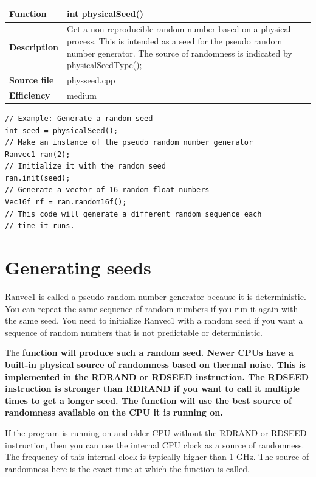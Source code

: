 \documentclass[11pt,a4paper,oneside,openright]{report}
\newcommand{\vspacesmall}{\vspace{3mm}}
\newcommand{\vspacebig}{\vspace{6mm}}
\newcommand{\codei}[1]{\bfseries \ttfamily{#1}\normalfont}
\begin{document}
\begin{tabular}{|p{30mm}|p{100mm}|}
\hline
\bfseries Function & int physicalSeed()  \\ \hline
\bfseries Description & Get a non-reproducible random number based on a physical process. This is intended as a seed for the pseudo random number generator. The source of randomness is indicated by physicalSeedType();  \\ \hline
\bfseries Source file & physseed.cpp \\ \hline
\bfseries Efficiency & medium \\ \hline
\end{tabular}
\begin{lstlisting}[frame=none]
// Example: Generate a random seed
int seed = physicalSeed();
// Make an instance of the pseudo random number generator
Ranvec1 ran(2);
// Initialize it with the random seed
ran.init(seed);
// Generate a vector of 16 random float numbers
Vec16f rf = ran.random16f();
// This code will generate a different random sequence each
// time it runs.
\end{lstlisting}
\vspacebig


\section{Generating seeds}\label{GeneratingSeeds}

Ranvec1 is called a pseudo random number generator because it is deterministic. You can repeat the same sequence of random numbers if you run it again with the same seed. 
You need to initialize Ranvec1 with a random seed if you want a sequence of random numbers that is not predictable or deterministic.
\vspacesmall

The \codei{physicalSeed()} function will produce such a random seed.
Newer CPUs have a built-in physical source of randomness based on thermal noise. This is implemented in the RDRAND or RDSEED instruction. The RDSEED instruction is stronger than RDRAND if you want to call it multiple times to get a longer seed. The \codei{physicalSeed()} function will use the best source of randomness available on the CPU it is running on.
\vspacesmall

If the program is running on and older CPU without the RDRAND or RDSEED instruction, then you can use the internal CPU clock as a source of randomness. The frequency of this internal clock is typically higher than 1 GHz. The source of randomness here is the exact time at which the function is called.
\vspacesmall
\end{document}
